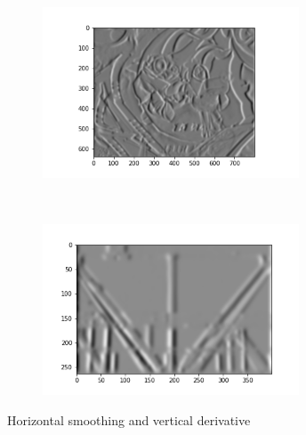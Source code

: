 \documentclass[
	12pt, %
]{fphw}
\begin{document}
\begin{figure}[h!]
    \centering
    \begin{subfigure}[t]{0.5\textwidth}
        \centering
        \includegraphics[height=2in]{img/1e/graf1.png}

    \end{subfigure}%
    ~ 
    \begin{subfigure}[t]{0.4\textwidth}
        \centering
        \includegraphics[height=2in]{img/1e/gantry1.png}

	\end{subfigure}
	\caption{Horizontal smoothing and vertical derivative}
\end{figure}

\newpage
\end{document}

